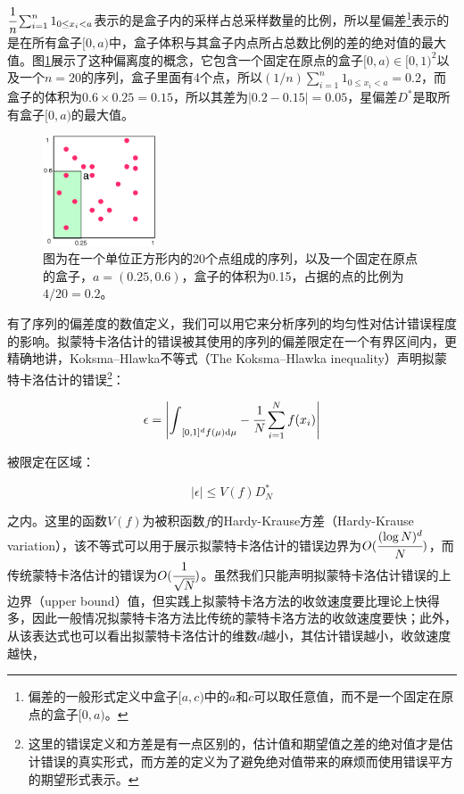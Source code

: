 \noindent $ \cfrac{1}{n}\sum^{n}_{i=1}1_{0\leq x_i<a}$表示的是盒子内的采样占总采样数量的比例，所以星偏差\footnote{偏差的一般形式定义中盒子$[a,c)$中的$a$和$c$可以取任意值，而不是一个固定在原点的盒子$[0,a)$。}表示的是在所有盒子$[0,a)$中，盒子体积与其盒子内点所占总数比例的差的绝对值的最大值。图\ref{f:mc-discrepancy}展示了这种偏离度的概念，它包含一个固定在原点的盒子$[0,a)\in [0,1)^2$以及一个$n=20$的序列，盒子里面有4个点，所以$(1/n)\sum^{n}_{i=1}1_{0\leq x_i<a}=0.2$，而盒子的体积为$0.6\times 0.25=0.15$，所以其差为$|0.2-0.15|=0.05$，星偏差$D^{*}$是取所有盒子$[0,a)$的最大值。

\begin{figure}
	\sidecaption
	\includegraphics[width=0.3\textwidth]{figures/mc/discrepancy}
	\caption{图为在一个单位正方形内的20个点组成的序列，以及一个固定在原点的盒子，$a=(0.25,0.6)$，盒子的体积为0.15，占据的点的比例为$4/20=0.2$。}
	\label{f:mc-discrepancy}
\end{figure}

有了序列的偏差度的数值定义，我们可以用它来分析序列的均匀性对估计错误程度的影响。拟蒙特卡洛估计的错误被其使用的序列的偏差限定在一个有界区间内，更精确地讲，Koksma–Hlawka不等式（The Koksma–Hlawka inequality）声明拟蒙特卡洛估计的错误\footnote{这里的错误定义和方差是有一点区别的，估计值和期望值之差的绝对值才是估计错误的真实形式，而方差的定义为了避免绝对值带来的麻烦而使用错误平方的期望形式表示。}：

\begin{equation}
	\epsilon=\Bigg| {\rm \int}_{[0,1]^{d}f(\mu){\rm d}\mu}- \cfrac{1}{N}\sum^{N}_{i=1}f(x_i) \Bigg|
\end{equation}

\noindent 被限定在区域：

\begin{equation}
	|\epsilon |\leq V(f)D^{*}_{N}
\end{equation}

\noindent 之内。这里的函数$V(f)$为被积函数$f$的Hardy-Krause方差（Hardy-Krause variation），该不等式可以用于展示拟蒙特卡洛估计的错误边界为$O( \cfrac{(\log{N})^{d}}{N})$，而传统蒙特卡洛估计的错误为$O( \cfrac{1}{\sqrt{N}})$。虽然我们只能声明拟蒙特卡洛估计错误的上边界（upper bound）值，但实践上拟蒙特卡洛方法的收敛速度要比理论上快得多，因此一般情况拟蒙特卡洛方法比传统的蒙特卡洛方法的收敛速度要快；此外，从该表达式也可以看出拟蒙特卡洛估计的维数$d$越小，其估计错误越小，收敛速度越快，





